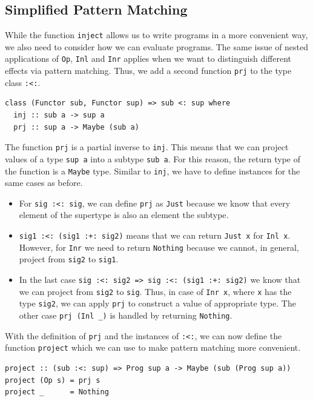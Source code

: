 \documentclass[a4paper, 11pt, fleqn, twoside]{scrreprt}
\newcommand{\hinl}[1]{\texttt{#1}}
\begin{document}
\subsection{Simplified Pattern Matching}
While the function \hinl{inject} allows us to write programs in a more convenient way, we also need to consider how we can evaluate programs.
The same issue of nested applications of \hinl{Op}, \hinl{Inl} and \hinl{Inr} applies when we want to distinguish different effects via pattern matching.
Thus, we add a second function \hinl{prj} to the type class \hinl{:<:}.

\begin{verbatim}
class (Functor sub, Functor sup) => sub <: sup where
  inj :: sub a -> sup a
  prj :: sup a -> Maybe (sub a)
\end{verbatim}

The function \hinl{prj} is a partial inverse to \hinl{inj}.
This means that we can project values of a type \hinl{sup a} into a subtype \hinl{sub a}.
For this reason, the return type of the function is a \hinl{Maybe} type.
Similar to \hinl{inj}, we have to define instances for the same cases as before.

\begin{itemize}
\item For \hinl{sig :<: sig}, we can define \hinl{prj} as \hinl{Just} because we know that every element of the supertype is also an element the subtype.

\item \hinl{sig1 :<: (sig1 :+: sig2)} means that we can return \hinl{Just x} for \hinl{Inl x}.
However, for \hinl{Inr} we need to return \hinl{Nothing} because we cannot, in general, project from \hinl{sig2} to \hinl{sig1}.

\item In the last case \hinl{sig :<: sig2 => sig :<: (sig1 :+: sig2)} we know that we can project from \hinl{sig2} to \hinl{sig}.
Thus, in case of \hinl{Inr x}, where \hinl{x} has the type \hinl{sig2}, we can apply \hinl{prj} to construct a value of appropriate type.
The other case \hinl{prj (Inl _)} is handled by returning \hinl{Nothing}.
\end{itemize}

With the definition of \hinl{prj} and the instances of \hinl{:<:}, we can now define the function \hinl{project} which we can use to make pattern matching more convenient.

\begin{verbatim}
project :: (sub :<: sup) => Prog sup a -> Maybe (sub (Prog sup a))
project (Op s) = prj s
project _      = Nothing
\end{verbatim}
\end{document}
